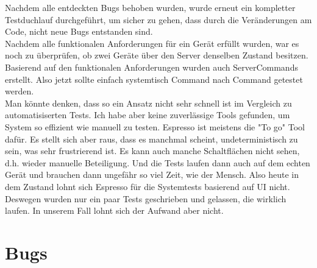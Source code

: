 \documentclass[11pt,a4paper]{scrartcl}
\begin{document}
Nachdem alle entdeckten Bugs behoben wurden, wurde erneut ein kompletter Testduchlauf durchgeführt, um sicher zu gehen, dass durch die Veränderungen am Code, nicht neue Bugs entstanden sind.\\

Nachdem alle funktionalen Anforderungen für ein Gerät erfüllt wurden, war es noch zu überprüfen, ob zwei Geräte über den Server denselben Zustand besitzen. Basierend auf den funktionalen Anforderungen wurden auch ServerCommands erstellt. Also jetzt sollte einfach systemtisch Command nach Command getestet werden. \\

Man könnte denken, dass so ein Ansatz nicht sehr schnell ist im Vergleich zu automatisiserten Tests. Ich habe aber keine zuverlässige Tools gefunden, um System so effizient wie manuell zu testen. Espresso ist meistens die "To go" Tool dafür. Es stellt sich aber raus, dass es manchmal scheint, undeterministisch zu sein, was sehr frustrierend ist. Es kann auch manche Schaltflächen nicht sehen, d.h. wieder manuelle Beteiligung. Und die Tests laufen dann auch auf dem echten Gerät und brauchen dann ungefähr so viel Zeit, wie der Mensch. Also heute in dem Zustand lohnt sich Espresso für die Systemtests basierend auf UI nicht. Deswegen wurden nur ein paar Tests geschrieben und gelassen, die wirklich laufen. In unserem Fall lohnt sich der Aufwand aber nicht.\\

\newpage

\section{Bugs}
\end{document}
